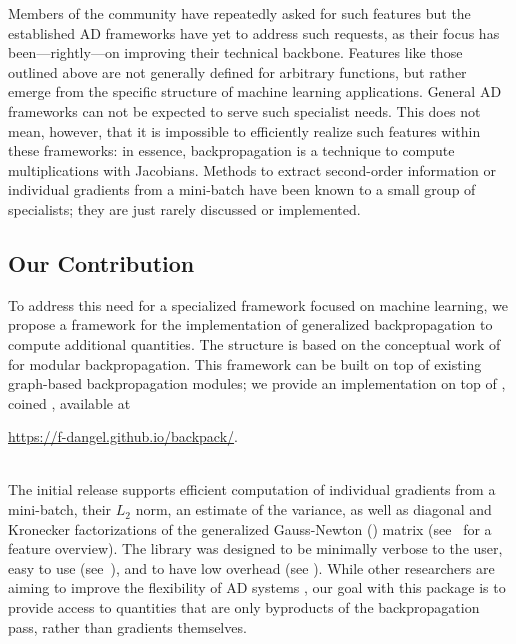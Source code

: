 Members of the community have repeatedly asked for such features %
but the established AD frameworks have yet to address such requests, as their
focus has been---rightly---on improving their technical backbone. Features like
those outlined above are not generally defined for arbitrary functions, but
rather emerge from the specific structure of machine learning applications.
General AD frameworks can not be expected to serve such specialist needs. This
does not mean, however, that it is impossible to efficiently realize such
features within these frameworks: in essence, backpropagation is a technique to
compute multiplications with Jacobians. Methods to extract second-order
information \citep{mizutani2008secondorder} or individual gradients from a
mini-batch \citep{goodfellow2015efficient} have been known to a small group of
specialists; they are just rarely discussed or implemented.

\subsection{Our Contribution}
To address this need for a specialized framework focused on machine learning, we
propose a framework for the implementation of generalized backpropagation to
compute additional quantities. The structure is based on the conceptual work of
\citet{dangel2020modular} for modular backpropagation. This framework can be
built on top of existing graph-based backpropagation modules; we provide an
implementation on top of \PyTorch, coined \BackPACK, available at
~\\[-1.75em]
\begin{center}
  \url{https://f-dangel.github.io/backpack/}.
\end{center}
~\\[-1.75em]
The initial release supports efficient computation of individual gradients from
a mini-batch, their $L_2$ norm, an estimate of the variance, as well as diagonal
and Kronecker factorizations of the generalized Gauss-Newton (\GGN) matrix
(see~ for a feature overview). The library
was designed to be minimally verbose to the user, easy to use
(see~), and to have low overhead (see
). While other researchers are aiming to improve
the flexibility of AD systems \citep{innes2018flux, innes2018zygote,
  bradbury2018jax}, our goal with this package is to provide access to
quantities that are only byproducts of the backpropagation pass, rather than
gradients themselves.

